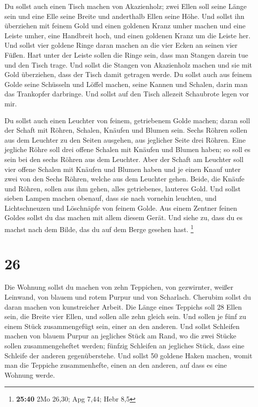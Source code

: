  Du sollst auch einen Tisch machen von Akazienholz; zwei
Ellen soll seine Länge sein und eine Elle seine Breite und anderthalb
Ellen seine Höhe.  Und sollst ihn überziehen mit feinem
Gold und einen goldenen Kranz umher machen  und eine
Leiste umher, eine Handbreit hoch, und einen goldenen Kranz um die
Leiste her.  Und sollst vier goldene Ringe daran machen
an die vier Ecken an seinen vier Füßen.  Hart unter der
Leiste sollen die Ringe sein, dass man Stangen darein tue und den Tisch
trage.  Und sollst die Stangen von Akazienholz machen und
sie mit Gold überziehen, dass der Tisch damit getragen werde.
 Du sollst auch aus feinem Golde seine Schüsseln und
Löffel machen, seine Kannen und Schalen, darin man das Trankopfer
darbringe.  Und sollst auf den Tisch allezeit Schaubrote
legen vor mir.

 Du sollst auch einen Leuchter von feinem, getriebenem
Golde machen; daran soll der Schaft mit Röhren, Schalen, Knäufen und
Blumen sein.  Sechs Röhren sollen aus dem Leuchter zu den
Seiten ausgehen, aus jeglicher Seite drei Röhren.  Eine
jegliche Röhre soll drei offene Schalen mit Knäufen und Blumen haben; so
soll es sein bei den sechs Röhren aus dem Leuchter.  Aber
der Schaft am Leuchter soll vier offene Schalen mit Knäufen und Blumen
haben  und je einen Knauf unter zwei von den Sechs
Röhren, welche aus dem Leuchter gehen.  Beide, die Knäufe
und Röhren, sollen aus ihm gehen, alles getriebenes, lauteres Gold.
 Und sollst sieben Lampen machen obenauf, dass sie nach
vornehin leuchten,  und Lichtschneuzen und Löschnäpfe von
feinem Golde.  Aus einem Zentner feinen Goldes sollst du
das machen mit allem diesem Gerät.  Und siehe zu, dass du
es machst nach dem Bilde, das du auf dem Berge gesehen hast. \footnote{\textbf{25:40}
  2Mo 26,30; Apg 7,44; Hebr 8,5}

\hypertarget{section-7}{%
\section{26}\label{section-7}}

 Die Wohnung sollst du machen von zehn Teppichen, von
gezwirnter, weißer Leinwand, von blauem und rotem Purpur und von
Scharlach. Cherubim sollst du daran machen von kunstreicher Arbeit.
 Die Länge eines Teppichs soll 28 Ellen sein, die Breite
vier Ellen, und sollen alle zehn gleich sein.  Und sollen
je fünf zu einem Stück zusammengefügt sein, einer an den anderen.
 Und sollst Schleifen machen von blauem Purpur an
jegliches Stück am Rand, wo die zwei Stücke sollen zusammengeheftet
werden;  fünfzig Schleifen an jegliches Stück, dass eine
Schleife der anderen gegenüberstehe.  Und sollst 50
goldene Haken machen, womit man die Teppiche zusammenhefte, einen an den
anderen, auf dass es eine Wohnung werde.

